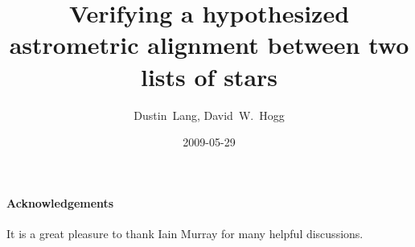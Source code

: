 \documentclass[letterpaper]{article}
\title{Verifying a hypothesized astrometric alignment between two lists of stars}
\author{Dustin~Lang, David~W.~Hogg}
\date{2009-05-29}
\begin{document}
\maketitle



\paragraph{Acknowledgements}
It is a great pleasure to thank Iain Murray for many helpful
discussions.

{\small
  
  
}
\end{document}
